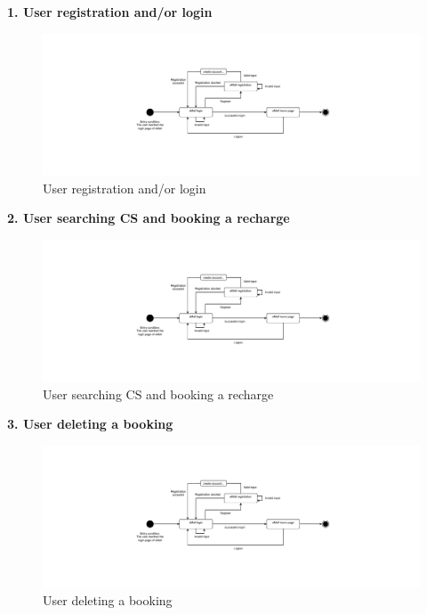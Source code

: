 \documentclass[11pt]{article}
\begin{document}
\begin{description}
    \item \textbf{1. User registration and/or login}
    \begin{figure}[!ht]
        \includegraphics[page={1}, width=\linewidth, trim=8cm 3cm 8cm 3cm, clip]{StateCharts.pdf}
        \caption{User registration and/or login}
    \end{figure}
    
    \item \textbf{2. User searching CS and booking a recharge}
    \begin{figure}[!ht]
        \includegraphics[page={2}, width=\linewidth, trim=2cm 4cm 2cm 4cm, clip]{StateCharts.pdf}
        \caption{User searching CS and booking a recharge}
    \end{figure}
    
    \item \textbf{3. User deleting a booking}
    \begin{figure}[!ht]
        \includegraphics[page={3}, width=\linewidth, trim=7cm 4cm 7cm 4cm, clip]{StateCharts.pdf}
        \caption{User deleting a booking}
    \end{figure}
    

\end{description}
\end{document}
